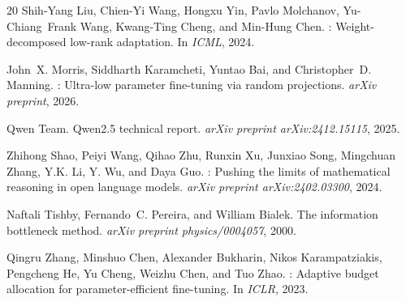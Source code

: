 \documentclass{article}
\begin{document}
\begin{thebibliography}{20}
Shih-Yang Liu, Chien-Yi Wang, Hongxu Yin, Pavlo Molchanov, Yu-Chiang~Frank Wang, Kwang-Ting Cheng, and Min-Hung Chen.
: Weight-decomposed low-rank adaptation.
\newblock In \emph{ICML}, 2024.

John~X. Morris, Siddharth Karamcheti, Yuntao Bai, and Christopher~D. Manning.
: Ultra-low parameter fine-tuning via random projections.
\newblock \emph{arXiv preprint}, 2026.

Qwen Team.
\newblock Qwen2.5 technical report.
\newblock \emph{arXiv preprint arXiv:2412.15115}, 2025.

Zhihong Shao, Peiyi Wang, Qihao Zhu, Runxin Xu, Junxiao Song, Mingchuan Zhang, Y.K. Li, Y. Wu, and Daya Guo.
: Pushing the limits of mathematical reasoning in open language models.
\newblock \emph{arXiv preprint arXiv:2402.03300}, 2024.

Naftali Tishby, Fernando~C. Pereira, and William Bialek.
\newblock The information bottleneck method.
\newblock \emph{arXiv preprint physics/0004057}, 2000.

Qingru Zhang, Minshuo Chen, Alexander Bukharin, Nikos Karampatziakis, Pengcheng He, Yu Cheng, Weizhu Chen, and Tuo Zhao.
: Adaptive budget allocation for parameter-efficient fine-tuning.
\newblock In \emph{ICLR}, 2023.

\end{thebibliography}
\end{document}
